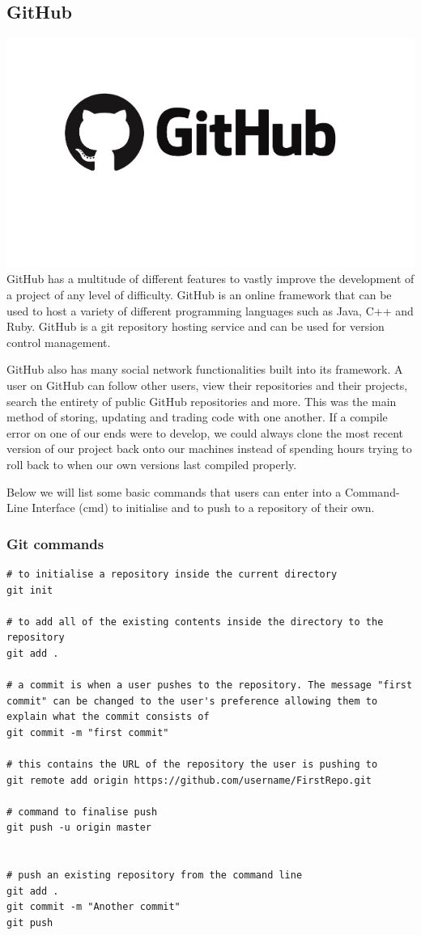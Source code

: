 \subsection{GitHub}
\includegraphics[scale=0.7]{img/github-logo.jpg}
GitHub has a multitude of different features to vastly improve the development of a project of any level of difficulty. GitHub is an online framework that can be used to host a variety of different programming languages such as Java, C++ and Ruby. GitHub is a git repository hosting service and can be used for version control management. \par
GitHub also has many social network functionalities built into its framework. A user on GitHub can follow other users, view their repositories and their projects, search the entirety of public GitHub repositories and more. This was the main method of storing, updating and trading code with one another. If a compile error on one of our ends were to develop, we could always clone the most recent version of our project back onto our machines instead of spending hours trying to roll back to when our own versions last compiled properly. \par
Below we will list some basic commands that users can enter into a Command-Line Interface (cmd) to initialise and to push to a repository of their own.
\subsubsection{Git commands}
\begin{verbatim}
# to initialise a repository inside the current directory
git init

# to add all of the existing contents inside the directory to the repository
git add .

# a commit is when a user pushes to the repository. The message "first commit" can be changed to the user's preference allowing them to explain what the commit consists of
git commit -m "first commit"

# this contains the URL of the repository the user is pushing to
git remote add origin https://github.com/username/FirstRepo.git 

# command to finalise push
git push -u origin master


# push an existing repository from the command line
git add .
git commit -m "Another commit"
git push

\end{verbatim}

